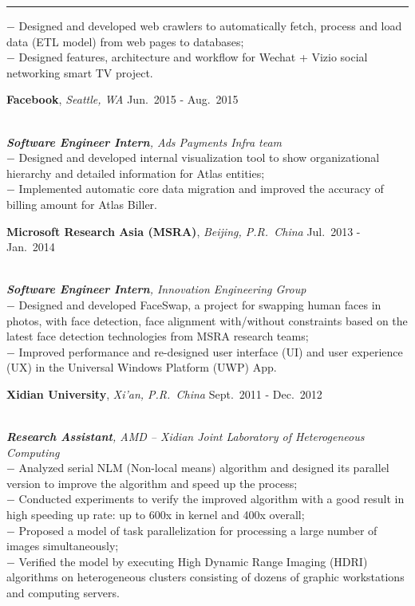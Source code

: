 \documentclass[a4paper,10pt]{article}
\newcommand{\shadedsection}[1]{
    \setlength{\fboxsep}{0pt}
    \colorbox{shadecolor}{%
        \begin{minipage}{\linewidth}%
            \vspace{0.2em}%
            #1%
        \end{minipage}%
    }
}
\newenvironment{rSection}[1]{ %
  \medskip
  \hspace{-1.5em}{\color{Blue}\MakeUppercase{\large \bf {#1}}} %
  \vspace{-0.2em}
  \medskip
  \hrule %
  \begin{list}{}{ %
    \setlength{\leftmargin}{1.5em} %
  }
\setlength{\itemsep}{1pt}
  \item[]
}{
  \end{list}
}
\newcommand{\detail}[1]{{$-$ {#1}}}
\newcommand{\period}[3]{\normalsize {#1} \hfill {#2} - {#3}}
\begin{document}
\begin{rSection}{Experience}
    \detail{Designed and developed web crawlers to automatically fetch, process and load data (ETL model) from web pages to databases;}\\
    \detail{Designed features, architecture and workflow for Wechat + Vizio social networking smart TV project.}
  \item
    \shadedsection{\period{{\bf Facebook}, {\em Seattle, WA}}{Jun.~2015}{Aug.~2015}}\\
    {\em {\bf Software Engineer Intern}, Ads Payments Infra team}\\
    \detail{Designed and developed internal visualization tool to show organizational hierarchy and detailed information for Atlas entities;}\\
    \detail{Implemented automatic core data migration and improved the accuracy of billing amount for Atlas Biller.}
  \item
    \shadedsection{\period{{\bf Microsoft Research Asia (MSRA)}, {\em Beijing, P.R.~China}}{Jul.~2013}{Jan.~2014}}\\
    {\em {\bf Software Engineer Intern}, Innovation Engineering Group}\\
    \detail{Designed and developed FaceSwap, a project for swapping human faces in photos, with face detection, face alignment with/without constraints based on the latest face detection technologies from MSRA research teams;}\\
    \detail{Improved performance and re-designed user interface (UI) and user experience (UX) in the Universal Windows Platform (UWP) App.}
  \item
    \shadedsection{\period{{\bf Xidian University}, {\em Xi'an, P.R.~China}}{Sept.~2011}{Dec.~2012}}\\
    {\em {\bf Research Assistant}, AMD -- Xidian Joint Laboratory of Heterogeneous Computing}\\
    \detail{Analyzed serial NLM (Non-local means) algorithm and designed its parallel version to improve the algorithm and speed up the process;}\\
    \detail{Conducted experiments to verify the improved algorithm with a good result in high speeding up rate: up to 600x in kernel and 400x overall;}\\
    \detail{Proposed a model of task parallelization for processing a large number of images simultaneously;}\\
    \detail{Verified the model by executing High Dynamic Range Imaging (HDRI) algorithms on heterogeneous clusters consisting of dozens of graphic workstations and computing servers.}
\end{rSection}
\end{document}
